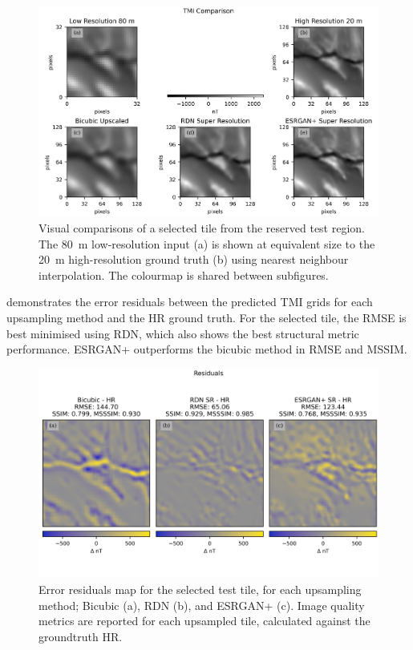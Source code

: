 \documentclass[manuscript.tex]{subfiles}
\begin{document}
\begin{figure}[hbt]
    \includegraphics[width=\linewidth,trim={0 0 0 5mm},clip]{fig/p1/resultsvis.png}
    \caption[Visual inference results]{Visual comparisons of a selected tile from the reserved test region.
        The \qty{80}{\metre} low-resolution input (a) is shown at equivalent size to the \qty{20}{\metre} high-resolution ground truth (b) using nearest neighbour interpolation.
        The colourmap is shared between subfigures.
    }
    \label{fig:resultsvis}
\end{figure}

 demonstrates the error residuals between the predicted TMI grids for each upsampling method and the HR ground truth.
For the selected tile, the RMSE is best minimised using RDN\textdaggerdbl{}, which also shows the best structural metric performance.
ESRGAN+ outperforms the bicubic method in RMSE and MSSIM\@.

\begin{figure}[hbt]
    \includegraphics[width=\linewidth,trim={0 10mm 0 5mm},clip]{fig/p1/residuals.png}
    \caption[Error residuals map for a selected tile]{Error residuals map for the selected test tile, for each upsampling method; Bicubic (a), RDN\textdaggerdbl{} (b), and ESRGAN+ (c).
        Image quality metrics are reported for each upsampled tile, calculated against the groundtruth HR\@.}
    \label{fig:residuals}
\end{figure}
\end{document}
